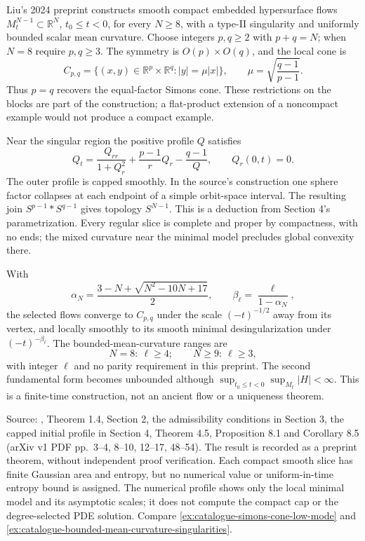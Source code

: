 \begin{example}\label{ex:catalogue-compact-lawson-cone-flows}
Liu's 2024 preprint constructs smooth compact embedded hypersurface flows $M_t^{N-1}\subset\mathbb R^N$, $t_0\leq t<0$, for every $N\geq8$, with a type-II singularity and uniformly bounded scalar mean curvature. Choose integers $p,q\geq2$ with $p+q=N$; when $N=8$ require $p,q\geq3$. The symmetry is $O(p)\times O(q)$, and the local cone is
\[
 C_{p,q}=\{(x,y)\in\mathbb R^p\times\mathbb R^q:
 |y|=\mu|x|\},\qquad \mu=\sqrt{\frac{q-1}{p-1}}.
\]
Thus $p=q$ recovers the equal-factor Simons cone. These restrictions on the blocks are part of the construction; a flat-product extension of a noncompact example would not produce a compact example.

Near the singular region the positive profile $Q$ satisfies
\[
 Q_t=\frac{Q_{rr}}{1+Q_r^2}+\frac{p-1}{r}Q_r-\frac{q-1}{Q},
 \qquad Q_r(0,t)=0.
\]
The outer profile is capped smoothly. In the source's construction one sphere factor collapses at each endpoint of a simple orbit-space interval. The resulting join $S^{p-1}*S^{q-1}$ gives topology $S^{N-1}$. This is a deduction from Section 4's parametrization. Every regular slice is complete and proper by compactness, with no ends; the mixed curvature near the minimal model precludes global convexity there.

With
\[
 \alpha_N=\frac{3-N+\sqrt{N^2-10N+17}}2,\qquad
 \beta_\ell=\frac{\ell}{1-\alpha_N},
\]
the selected flows converge to $C_{p,q}$ under the scale $(-t)^{-1/2}$ away from its vertex, and locally smoothly to its smooth minimal desingularization under $(-t)^{-\beta_\ell}$. The bounded-mean-curvature ranges are
\[
 N=8:\ \ell\geq4;\qquad N\geq9:\ \ell\geq3,
\]
with integer $\ell$ and no parity requirement in this preprint. The second fundamental form becomes unbounded although $\sup_{t_0\leq t<0}\sup_{M_t}|H|<\infty$. This is a finite-time construction, not an ancient flow or a uniqueness theorem.

Source: \cite{CatLiu2024}, Theorem 1.4, Section 2, the admissibility conditions in Section 3, the capped initial profile in Section 4, Theorem 4.5, Proposition 8.1 and Corollary 8.5 (arXiv v1 PDF pp.~3--4, 8--10, 12--17, 48--54). The result is recorded as a preprint theorem, without independent proof verification. Each compact smooth slice has finite Gaussian area and entropy, but no numerical value or uniform-in-time entropy bound is assigned. The numerical profile shows only the local minimal model and its asymptotic scales; it does not compute the compact cap or the degree-selected PDE solution. Compare \ref{ex:catalogue-simons-cone-low-mode} and \ref{ex:catalogue-bounded-mean-curvature-singularities}.
\end{example}

